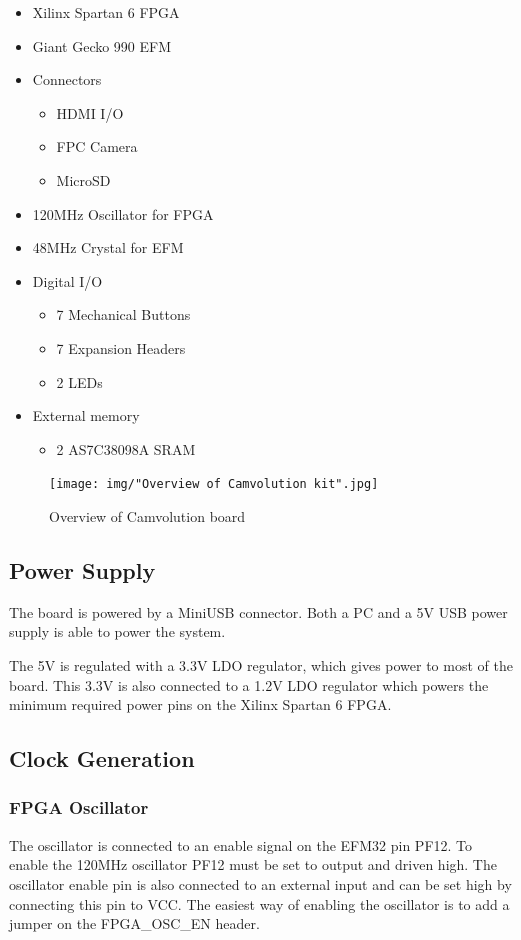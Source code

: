 \begin{itemize}
    \item Xilinx Spartan 6 FPGA
    \item Giant Gecko 990 EFM
    \item Connectors
        \begin{itemize}
            \item HDMI I/O
            \item FPC Camera
            \item MicroSD
        \end{itemize}
    \item 120MHz Oscillator for FPGA
    \item 48MHz Crystal for EFM
    \item Digital I/O
        \begin{itemize}
            \item 7 Mechanical Buttons
            \item 7 Expansion Headers
            \item 2 LEDs
        \end{itemize}
    \item External memory
        \begin{itemize}
            \item 2 AS7C38098A SRAM
        \end{itemize}
\end{itemize}

\begin{figure}
    \texttt{[image: img/"Overview of Camvolution kit".jpg]}
    \caption{Overview of Camvolution board}
    \label{fig:BoardLayout}
\end{figure}

\subsection{Power Supply}
The board is powered by a MiniUSB connector.
Both a PC and a 5V USB power supply is able to power the system.

The 5V is regulated with a 3.3V LDO regulator, which gives power to most of the board.
This 3.3V is also connected to a 1.2V LDO regulator which powers the minimum required power pins on the Xilinx Spartan 6 FPGA.

\subsection{Clock Generation}
\subsubsection{FPGA Oscillator}
The oscillator is connected to an enable signal on the EFM32 pin PF12.
To enable the 120MHz oscillator PF12 must be set to output and driven high.
The oscillator enable pin is also connected to an external input and can be set high by connecting this pin to VCC.
The easiest way of enabling the oscillator is to add a jumper on the FPGA\_OSC\_EN header.

